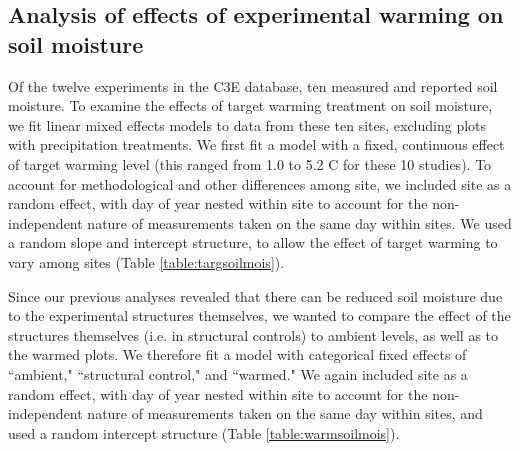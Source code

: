 \documentclass{article}
\begin{document}
\subsection* {Analysis of effects of experimental warming on soil moisture}
Of the twelve experiments in the C3E database, ten measured and reported soil moisture. To examine the effects of target warming treatment on soil moisture, we fit linear mixed effects models to data from these ten sites, excluding plots with precipitation treatments. We first fit a model with a fixed, continuous effect of target warming level (this ranged from 1.0 to 5.2 \degree C for these 10 studies). To account for methodological and other differences among site, we included site as a random effect, with day of year nested within site to account for the non-independent nature of measurements taken on the same day within sites.  We used a random slope and intercept structure, to allow the effect of target warming to vary among sites (Table \ref{table:targsoilmois}). 
\par Since our previous analyses revealed that there can be reduced soil moisture due to the experimental structures themselves, we wanted to compare the effect of the structures themselves (i.e. in structural controls) to ambient levels, as well as to the warmed plots. We therefore fit a model with categorical fixed effects of ``ambient," ``structural control," and ``warmed."  We again included site as a random effect, with day of year nested within site to account for the non-independent nature of measurements taken on the same day within sites, and used a random intercept structure (Table \ref{table:warmsoilmois}). 

\end{document}
